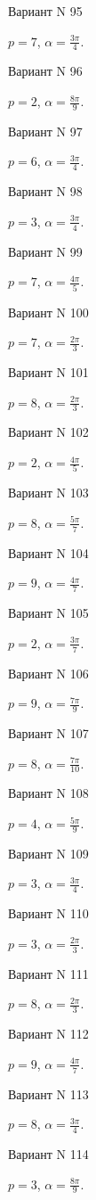 \documentclass[11pt]{report}
\begin{document}
Вариант N 95

$p = 7$, $\alpha = \frac{3 \pi}{4}$.

Вариант N 96

$p = 2$, $\alpha = \frac{8 \pi}{9}$.

Вариант N 97

$p = 6$, $\alpha = \frac{3 \pi}{4}$.

Вариант N 98

$p = 3$, $\alpha = \frac{3 \pi}{4}$.

Вариант N 99

$p = 7$, $\alpha = \frac{4 \pi}{5}$.

Вариант N 100

$p = 7$, $\alpha = \frac{2 \pi}{3}$.

Вариант N 101

$p = 8$, $\alpha = \frac{2 \pi}{3}$.

Вариант N 102

$p = 2$, $\alpha = \frac{4 \pi}{5}$.

Вариант N 103

$p = 8$, $\alpha = \frac{5 \pi}{7}$.

Вариант N 104

$p = 9$, $\alpha = \frac{4 \pi}{7}$.

Вариант N 105

$p = 2$, $\alpha = \frac{3 \pi}{7}$.

Вариант N 106

$p = 9$, $\alpha = \frac{7 \pi}{9}$.

Вариант N 107

$p = 8$, $\alpha = \frac{7 \pi}{10}$.

Вариант N 108

$p = 4$, $\alpha = \frac{5 \pi}{9}$.

Вариант N 109

$p = 3$, $\alpha = \frac{3 \pi}{4}$.

Вариант N 110

$p = 3$, $\alpha = \frac{2 \pi}{3}$.

Вариант N 111

$p = 8$, $\alpha = \frac{2 \pi}{3}$.

Вариант N 112

$p = 9$, $\alpha = \frac{4 \pi}{7}$.

Вариант N 113

$p = 8$, $\alpha = \frac{3 \pi}{4}$.

Вариант N 114

$p = 3$, $\alpha = \frac{8 \pi}{9}$.
\end{document}

